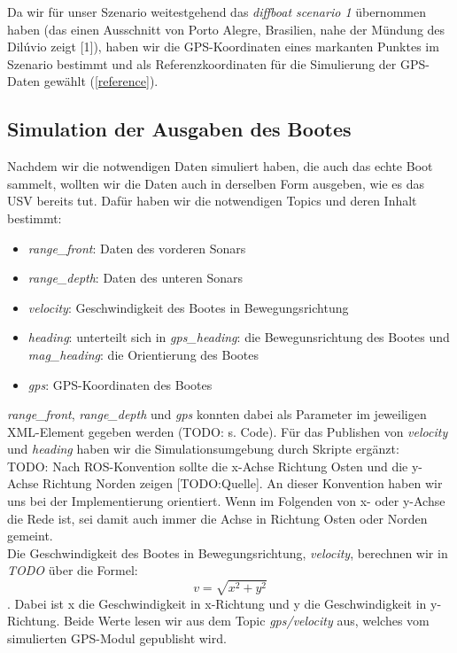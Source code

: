 \documentclass[conference]{IEEEtran}
\begin{document}
Da wir für unser Szenario weitestgehend das \textit{diffboat scenario 1} übernommen haben (das einen Ausschnitt von Porto Alegre, Brasilien, nahe der Mündung des Dilúvio zeigt [1]), haben wir die GPS-Koordinaten eines markanten Punktes im Szenario bestimmt und als Referenzkoordinaten für die Simulierung der GPS-Daten gewählt (\ref{reference}).

\subsection{Simulation der Ausgaben des Bootes}
Nachdem wir die notwendigen Daten simuliert haben, die auch das echte Boot sammelt, wollten wir die Daten auch in derselben Form ausgeben, wie es das USV bereits tut. Dafür haben wir die notwendigen Topics und deren Inhalt bestimmt:
\begin{itemize}
	\item \textit{range\_front}: Daten des vorderen Sonars
	\item \textit{range\_depth}: Daten des unteren Sonars
	\item \textit{velocity}: Geschwindigkeit des Bootes in Bewegungsrichtung
	\item \textit{heading}: unterteilt sich in \textit{gps\_heading}: die Bewegunsrichtung des Bootes und \textit{mag\_heading}: die Orientierung des Bootes
	\item \textit{gps}: GPS-Koordinaten des Bootes
\end{itemize}
\textit{range\_front}, \textit{range\_depth} und \textit{gps} konnten dabei als Parameter im jeweiligen XML-Element gegeben werden (TODO: s. Code). Für das Publishen von \textit{velocity} und \textit{heading} haben wir die Simulationsumgebung durch Skripte ergänzt:\\
TODO: Nach ROS-Konvention sollte die x-Achse Richtung Osten und die y-Achse Richtung Norden zeigen [TODO:Quelle]. An dieser Konvention haben wir uns bei der Implementierung orientiert. Wenn im Folgenden von x- oder y-Achse die Rede ist, sei damit auch immer die Achse in Richtung Osten oder Norden gemeint.\\
Die Geschwindigkeit des Bootes in Bewegungsrichtung, \textit{velocity}, berechnen wir in \textit{TODO} über die Formel:
\begin{equation}
v = \sqrt{x^2+y^2}
\end{equation}
. Dabei ist x die Geschwindigkeit in x-Richtung und y die Geschwindigkeit in y-Richtung. Beide Werte lesen wir aus dem Topic \textit{gps/velocity} aus, welches vom simulierten GPS-Modul gepublisht wird.\\
\end{document}
